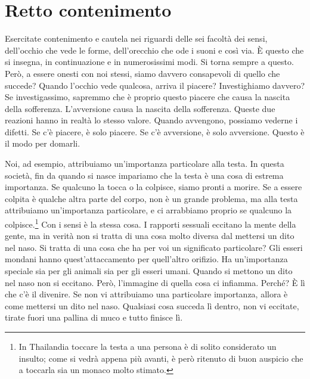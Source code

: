 \chapter{Retto contenimento}

Esercitate contenimento e cautela nei riguardi delle sei facoltà dei
sensi, dell'occhio che vede le forme, dell'orecchio che ode i suoni e
così via. È questo che si insegna, in continuazione e in numerosissimi
modi. Si torna sempre a questo. Però, a essere onesti con noi stessi,
siamo davvero consapevoli di quello che succede? Quando l'occhio vede
qualcosa, arriva il piacere? Investighiamo davvero? Se investigassimo,
sapremmo che è proprio questo piacere che causa la nascita della
sofferenza. L'avversione causa la nascita della sofferenza. Queste due
reazioni hanno in realtà lo stesso valore. Quando avvengono, possiamo
vederne i difetti. Se c'è piacere, è solo piacere. Se c'è avversione, è
solo avversione. Questo è il modo per domarli.

Noi, ad esempio, attribuiamo un'importanza particolare alla testa. In
questa società, fin da quando si nasce impariamo che la testa è una cosa
di estrema importanza. Se qualcuno la tocca o la colpisce, siamo pronti
a morire. Se a essere colpita è qualche altra parte del corpo, non è un
grande problema, ma alla testa attribuiamo un'importanza particolare, e
ci arrabbiamo proprio se qualcuno la colpisce.\footnote{In Thailandia
  toccare la testa a una persona è di solito considerato un insulto;
  come si vedrà appena più avanti, è però ritenuto di buon auspicio che
  a toccarla sia un monaco molto stimato.} Con i sensi è la stessa cosa.
I rapporti sessuali eccitano la mente della gente, ma in verità non si
tratta di una cosa molto diversa dal mettersi un dito nel naso. Si
tratta di una cosa che ha per voi un significato particolare? Gli esseri
mondani hanno quest'attaccamento per quell'altro orifizio. Ha
un'importanza speciale sia per gli animali sia per gli esseri umani.
Quando si mettono un dito nel naso non si eccitano. Però, l'immagine di
quella cosa ci infiamma. Perché? È lì che c'è il divenire. Se non vi
attribuiamo una particolare importanza, allora è come mettersi un dito
nel naso. Qualsiasi cosa succeda lì dentro, non vi eccitate, tirate
fuori una pallina di muco e tutto finisce lì.

